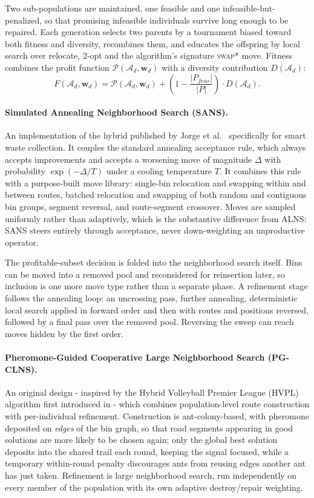 \documentclass[orivec,runningheads]{llncs}
\begin{document}
Two sub-populations are maintained, one feasible and one infeasible-but-penalized, so that promising infeasible individuals survive long enough to be repaired.
Each generation selects two parents by a tournament biased toward both fitness
and diversity, recombines them, and educates the offspring by local search over
relocate, 2-opt and the algorithm's signature \textsc{swap*} move.
Fitness combines the profit function $\mathcal{P}(\mathcal{A}_d, \bm{w}_d)$ with a
diversity contribution $D(\mathcal{A}_d)$:
\begin{equation}
    F(\mathcal{A}_d, \bm{w}_d) = \mathcal{P}(\mathcal{A}_d, \bm{w}_d) + \left(1 - \frac{|P_{feas}|}{|P|}\right) \cdot D(\mathcal{A}_d).
\end{equation}

\paragraph{Simulated Annealing Neighborhood Search (SANS).}
An implementation of the hybrid published by Jorge et
al.~\cite{jorge2022hybrid} specifically for smart waste collection. It couples
the standard annealing acceptance rule, which always accepts improvements and
accepts a worsening move of magnitude $\Delta$ with probability $\exp(-\Delta/T)$
under a cooling temperature $T$. It combines this rule with a purpose-built move
library: single-bin relocation and swapping within and between routes, batched
relocation and swapping of both random and contiguous bin groups, segment
reversal, and route-segment crossover. Moves are sampled uniformly rather than
adaptively, which is the substantive difference from ALNS: SANS steers entirely
through acceptance, never down-weighting an unproductive operator.

The profitable-subset decision is folded into the neighborhood search itself. 
Bins can be moved into a removed pool and reconsidered for reinsertion later, so
inclusion is one more move type rather than a separate phase. A refinement stage
follows the annealing loop: an uncrossing pass, further annealing, deterministic
local search applied in forward order and then with routes and positions
reversed, followed by a final pass over the removed pool. Reversing the sweep
can reach moves hidden by the first order.

\paragraph{Pheromone-Guided Cooperative Large Neighborhood Search (PG-CLNS).}
An original design - inspired by the Hybrid Volleyball Premier League (HVPL) algorithm first introduced in \cite{SUN2023111004} - which combines population-level route construction with per-individual refinement. Construction is ant-colony-based, with pheromone deposited on
\emph{edges} of the bin graph, so that road segments appearing in good solutions
are more likely to be chosen again; only the global best solution deposits into
the shared trail each round, keeping the signal focused, while a temporary
within-round penalty discourages ants from reusing edges another ant has just
taken. Refinement is large neighborhood search, run independently on every
member of the population with its own adaptive destroy/repair weighting.
\end{document}

